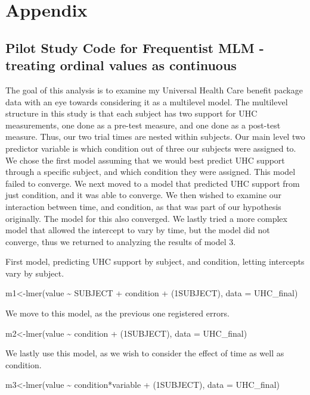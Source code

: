 \documentclass[
]{article}
\begin{document}
\hypertarget{appendix}{%
\section{Appendix}\label{appendix}}

\hypertarget{pilot-study-code-for-frequentist-mlm---treating-ordinal-values-as-continuous}{%
\subsection{Pilot Study Code for Frequentist MLM - treating ordinal
values as
continuous}\label{pilot-study-code-for-frequentist-mlm---treating-ordinal-values-as-continuous}}

The goal of this analysis is to examine my Universal Health Care benefit
package data with an eye towards considering it as a multilevel model.
The multilevel structure in this study is that each subject has two
support for UHC measurements, one done as a pre-test measure, and one
done as a post-test measure. Thus, our two trial times are nested within
subjects. Our main level two predictor variable is which condition out
of three our subjects were assigned to. We chose the first model
assuming that we would best predict UHC support through a specific
subject, and which condition they were assigned. This model failed to
converge. We next moved to a model that predicted UHC support from just
condition, and it was able to converge. We then wished to examine our
interaction between time, and condition, as that was part of our
hypothesis originally. The model for this also converged. We lastly
tried a more complex model that allowed the intercept to vary by time,
but the model did not converge, thus we returned to analyzing the
results of model 3.

First model, predicting UHC support by subject, and condition, letting
intercepts vary by subject.

m1\textless-lmer(value \textasciitilde{} SUBJECT + condition +
(1\textbar SUBJECT), data = UHC\_final)

We move to this model, as the previous one registered errors.

m2\textless-lmer(value \textasciitilde{} condition +
(1\textbar SUBJECT), data = UHC\_final)

We lastly use this model, as we wish to consider the effect of time as
well as condition.

m3\textless-lmer(value \textasciitilde{} condition*variable +
(1\textbar SUBJECT), data = UHC\_final)
\end{document}
